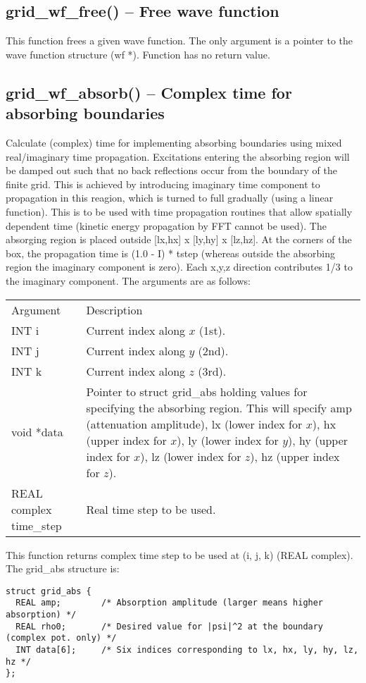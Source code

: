 \documentclass[12pt,letterpaper]{report}
\begin{document}
\subsection{grid\_wf\_free() -- Free wave function}

This function frees a given wave function. The only argument is a pointer to the wave function structure (wf *). Function has no return value.

\subsection{grid\_wf\_absorb() -- Complex time for absorbing boundaries}

Calculate (complex) time for implementing absorbing boundaries using mixed real/imaginary time propagation. Excitations entering the absorbing region will be damped out
such that no back reflections occur from the boundary of the finite grid.
This is achieved by introducing imaginary time component to propagation
in this reagion, which is turned to full gradually (using a linear function).
This is to be used with time propagation routines that allow spatially dependent
time (kinetic energy propagation by FFT cannot be used). The absorging region is placed outside [lx,hx] x [ly,hy] x [lz,hz]. At the corners of the box, the propagation time
is (1.0 - I) * tstep (whereas outside the absorbing region the imaginary
component is zero). Each x,y,z direction contributes 1/3 to the imaginary component.
The arguments are as follows:
\begin{longtable}{p{} p{}}
Argument & Description\\
\cline{1-2}
INT i & Current index along $x$ (1st).\\                                                                                    
INT j & Current index along $y$ (2nd).\\
INT k & Current index along $z$ (3rd).\\
void *data & Pointer to struct grid\_abs holding values for specifying the absorbing region. This will specify amp (attenuation amplitude), lx (lower index for $x$), hx (upper index for $x$), ly (lower index for $y$), hy (upper index for $x$), lz (lower index for $z$), hz (upper index for $z$).\\
REAL complex time\_step & Real time step to be used.\\
\end{longtable}
\noindent
This function returns complex time step to be used at (i, j, k) (REAL complex). The grid\_abs structure is:
\begin{verbatim}
struct grid_abs {
  REAL amp;        /* Absorption amplitude (larger means higher absorption) */
  REAL rho0;       /* Desired value for |psi|^2 at the boundary (complex pot. only) */
  INT data[6];     /* Six indices corresponding to lx, hx, ly, hy, lz, hz */
};
\end{verbatim}
\end{document}
